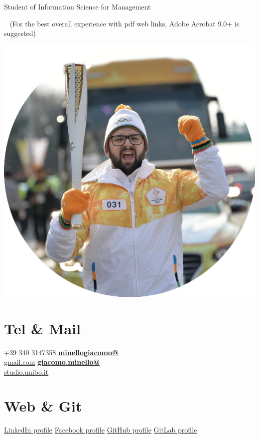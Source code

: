 \documentclass[]{friggeri-cv}
\begin{document}
       {\hspace{3,3cm} Student of Information Science for Management}
       
  
 

~
\scriptsize
{(For the best overall experience with pdf web links, Adobe Acrobat 9.0+ is suggested)} 


\normalsize
\begin{aside}
  \includegraphics[scale=0.11]{9912844.png}
  \section{Tel \& Mail}
    +39 340 3147358
    \href{mailto:minellogiacomo@gmail.com}{\textbf{minellogiacomo@}\\gmail.com}
    \href{mailto:giacomo.minello@studio.unibo.it}{\textbf{giacomo.minello@}\\studio.unibo.it}
    ~
\section{Web \& Git}
    \href{https://www.linkedin.com/in/giacomominello}{LinkedIn profile}
    \href{https://www.facebook.com/giacomo.minello}{Facebook profile}
    \href{https://github.com/MGRizzly}{GitHub profile} 
    \href{https://gitlab.com/users/minellogiacomo/groups}{GitLab profile}
    ~

\end{aside}
\end{document}
